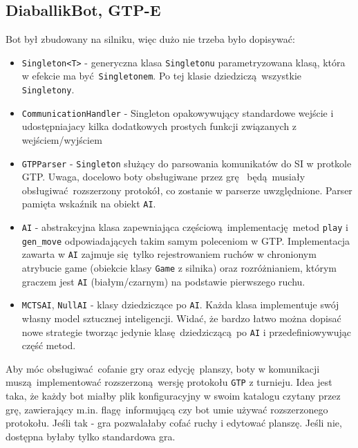 \documentclass[a4paper,12pt]{article}
\begin{document}
\subsection{DiaballikBot, GTP-E}
Bot był zbudowany na silniku, więc dużo nie trzeba było dopisywać:
\begin{itemize}
 \item \verb|Singleton<T>| - generyczna klasa \verb|Singletonu| parametryzowana klasą, która w efekcie ma być \verb|Singletonem|. Po tej klasie 
 dziedziczą wszystkie \verb|Singletony|.
 \item \verb|CommunicationHandler| - Singleton opakowywujący standardowe wejście i udostępniajacy kilka dodatkowych prostych funkcji związanych z 
 wejściem/wyjściem
 \item \verb|GTPParser| - \verb|Singleton| służący do parsowania komunikatów do SI w protkole GTP. Uwaga, docelowo boty obsługiwane przez grę 
 będą musiały obsługiwać rozszerzony protokół, co zostanie w parserze uwzględnione. Parser pamięta wskaźnik na obiekt \verb|AI|.
 \item \verb|AI| - abstrakcyjna klasa zapewniająca częściową implementację metod \verb|play| i \verb|gen_move| odpowiadających takim samym 
 poleceniom w GTP. Implementacja zawarta w \verb|AI| zajmuje się tylko rejestrowaniem ruchów w chronionym atrybucie game (obiekcie klasy 
 \verb|Game| z silnika) oraz rozróżnianiem, którym graczem jest \verb|AI| (białym/czarnym) na podstawie pierwszego ruchu.
 \item \verb|MCTSAI|, \verb|NullAI| - klasy dziedziczące po \verb|AI|. Każda klasa implementuje swój własny model sztucznej inteligencji. 
 Widać, że bardzo łatwo można dopisać nowe strategie tworząc jedynie klasę dziedziczącą po \verb|AI| i przedefiniowywując część metod.
\end{itemize}
Aby móc obsługiwać cofanie gry oraz edycję planszy, boty w komunikacji muszą implementować rozszerzoną wersję protokołu \verb|GTP| z turnieju. 
Idea jest taka, że każdy bot miałby plik konfiguracyjny w swoim katalogu czytany przez grę, zawierający m.in. flagę informującą czy bot umie 
używać rozszerzonego protokołu. Jeśli tak - gra pozwalałaby cofać ruchy i edytować planszę. Jeśli nie, dostępna byłaby tylko standardowa gra.
\end{document}
